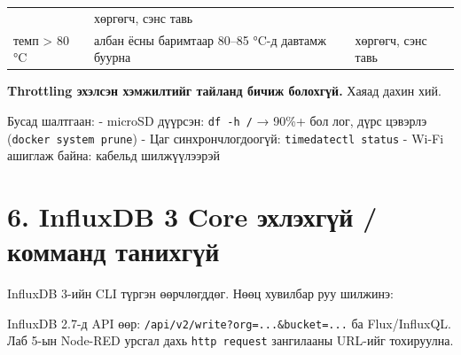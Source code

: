 \begin{longtable}[]{@{}lll@{}}
\begin{minipage}[t]{0.30\columnwidth}
\end{minipage} & \begin{minipage}[t]{0.30\columnwidth}\raggedright
хөргөгч, сэнс тавь\strut
\end{minipage}\tabularnewline
\begin{minipage}[t]{0.30\columnwidth}\raggedright
темп \textgreater{} 80 °C\strut
\end{minipage} & \begin{minipage}[t]{0.30\columnwidth}\raggedright
албан ёсны баримтаар 80--85 °C-д давтамж буурна\strut
\end{minipage} & \begin{minipage}[t]{0.30\columnwidth}\raggedright
хөргөгч, сэнс тавь\strut
\end{minipage}\tabularnewline
\bottomrule
\end{longtable}\endgroup

\textbf{Throttling эхэлсэн хэмжилтийг тайланд бичиж болохгүй.} Хаяад дахин хий.

Бусад шалтгаан:
- microSD дүүрсэн: \texttt{df\ -h\ /} → 90\%+ бол лог, дүрс цэвэрлэ (\texttt{docker\ system\ prune})
- Цаг синхрончлогдоогүй: \texttt{timedatectl\ status}
- Wi-Fi ашиглаж байна: кабельд шилжүүлээрэй

\hypertarget{influxdb-3-core-ux44dux445ux43bux44dux445ux433ux4afux439-ux43aux43eux43cux43cux430ux43dux434-ux442ux430ux43dux438ux445ux433ux4afux439}{%
\section{6. InfluxDB 3 Core эхлэхгүй / комманд танихгүй}\label{influxdb-3-core-ux44dux445ux43bux44dux445ux433ux4afux439-ux43aux43eux43cux43cux430ux43dux434-ux442ux430ux43dux438ux445ux433ux4afux439}}

InfluxDB 3-ийн CLI түргэн өөрчлөгддөг. Нөөц хувилбар руу шилжинэ:

\begin{Shaded}
\begin{Highlighting}[]
\KeywordTok{\textbackslash{}}
\end{Highlighting}
\end{Shaded}

InfluxDB 2.7-д API өөр: \texttt{/\allowbreak{}api/\allowbreak{}v2/\allowbreak{}write?\allowbreak{}org=\allowbreak{}.\allowbreak{}.\allowbreak{}.\allowbreak{}\&\allowbreak{}bucket=\allowbreak{}.\allowbreak{}.\allowbreak{}.\allowbreak{}} ба Flux/InfluxQL. Лаб 5-ын Node-RED урсгал дахь \texttt{http\ request} зангилааны URL-ийг тохируулна.

